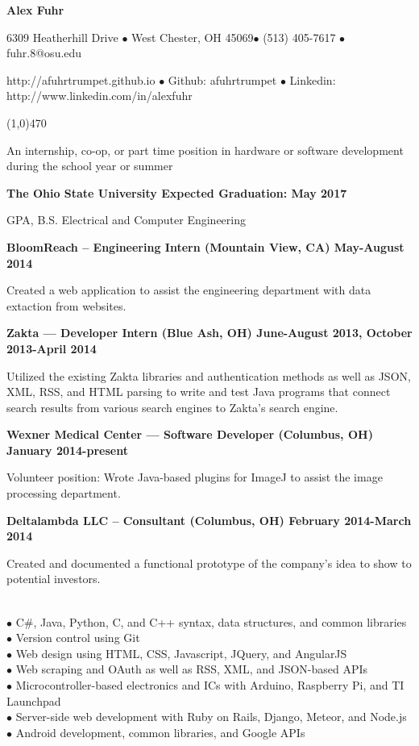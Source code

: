 \documentclass[10pt]{article}
\begin{document}
\centerline{{\LARGE \bf Alex Fuhr}}

\centerline{6309 Heatherhill Drive $\bullet$ West Chester, OH 45069$\bullet$ (513) 405-7617 $\bullet$ fuhr.8@osu.edu}
\centerline{http://afuhrtrumpet.github.io $\bullet$ Github: afuhrtrumpet $\bullet$ Linkedin: http://www.linkedin.com/in/alexfuhr}
\noindent
\line(1,0){470}\\

\smallskip

\noindent
An internship, co-op, or part time position in hardware or software development during the school year or summer
\medskip

\smallskip

\centerline{{\large \bf The Ohio State University \hfill Expected Graduation: May 2017}}
 GPA, B.S. Electrical and Computer Engineering
\medskip

\smallskip

\centerline{{\large \bf BloomReach -- Engineering Intern (Mountain View, CA) \hfill May-August 2014}}
\noindent
Created a web application to assist the engineering department with data extaction from websites.

\centerline{{\large \bf Zakta --- Developer Intern (Blue Ash, OH) \hfill June-August 2013, October 2013-April 2014}}
\noindent
Utilized the existing Zakta libraries and authentication methods as well as JSON, XML, RSS, and HTML parsing to write and test Java programs that connect search results from various search engines to Zakta's search engine.

\centerline{{\large \bf Wexner Medical Center --- Software Developer (Columbus, OH) \hfill January 2014-present}}
\noindent
Volunteer position: Wrote Java-based plugins for ImageJ to assist the image processing department.

\centerline{{\large \bf Deltalambda LLC -- Consultant (Columbus, OH) \hfill February 2014-March 2014}}
\noindent
Created and documented a functional prototype of the company's idea to show to potential investors.
\medskip

\\
\smallskip
$\bullet$ C\#, Java, Python, C, and C++ syntax, data structures, and common libraries\\
$\bullet$ Version control using Git\\
$\bullet$ Web design using HTML, CSS, Javascript, JQuery, and AngularJS\\
$\bullet$ Web scraping and OAuth as well as RSS, XML, and JSON-based APIs\\
$\bullet$ Microcontroller-based electronics and ICs with Arduino, Raspberry Pi, and TI Launchpad\\
$\bullet$ Server-side web development with Ruby on Rails, Django, Meteor, and Node.js\\
$\bullet$ Android development, common libraries, and Google APIs
\medskip
\end{document}
